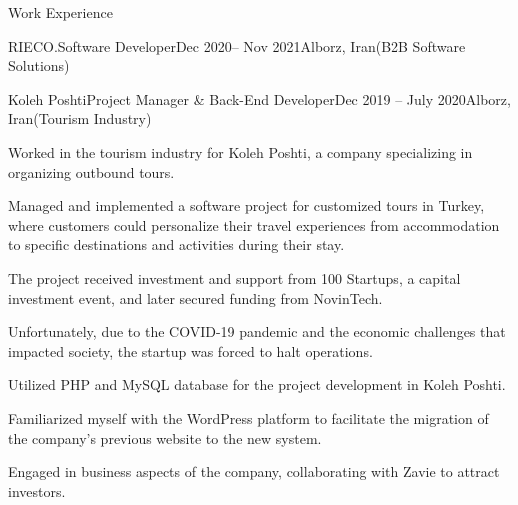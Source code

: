 \documentclass[]{kyvernitis-resume}
\begin{document}
\begin{section}{Work Experience}
\begin{subsection}{RIECO.}{Software Developer}{Dec 2020-- Nov 2021}{Alborz, Iran}{(B2B Software Solutions)}
    \end{subsection}
    
    \begin{subsection}{Koleh Poshti}{Project Manager \& Back-End Developer}{Dec 2019 -- July 2020}{Alborz, Iran}{(Tourism Industry)}
        	\item Worked in the tourism industry for Koleh Poshti, a company specializing in organizing outbound tours.

	\item Managed and implemented a software project for customized tours in Turkey, where customers could personalize their travel experiences from accommodation to specific destinations and activities during their stay.

	\item The project received investment and support from 100 Startups, a capital investment event, and later secured funding from NovinTech.

	\item Unfortunately, due to the COVID-19 pandemic and the economic challenges that impacted society, the startup was forced to halt operations.

	\item Utilized PHP and MySQL database for the project development in Koleh Poshti.

	\item Familiarized myself with the WordPress platform to facilitate the migration of the company's previous website to the new system.

	\item Engaged in business aspects of the company, collaborating with Zavie to attract investors.
    \end{subsection}
    

\end{section}
\end{document}
